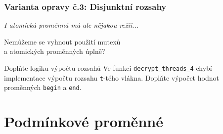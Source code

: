 \documentclass[usenames,dvipsnames,9pt]{beamer}
\begin{document}
\begin{frame}[fragile]
  \frametitle{Varianta opravy č.3: Disjunktní rozsahy}
  \emph{I atomická proměnná má ale nějakou režii...}
  \begin{center}
    \Large Nemůžeme se vyhnout použití mutexů \\ a atomických proměnných úplně?
  \end{center}

  \pause
  \vspace{3em}

  \begin{block}{Doplňte logiku výpočtu rozsahů}
    Ve funkci \texttt{decrypt\_threads\_4} chybí implementace výpočtu rozsahu \texttt{t}-tého vlákna.
    Doplňte výpočet hodnot proměnných \texttt{begin} a \texttt{end}.
  \end{block}
\end{frame}

\section{Podmínkové proměnné}
\end{document}
